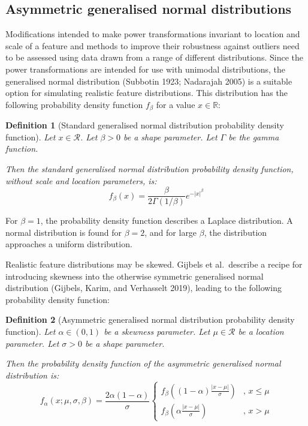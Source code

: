 \documentclass[
  a4paper,
]{article}
\newtheorem*{definition}{Definition}
\begin{document}
\subsection{Asymmetric generalised normal
distributions}\label{asymmetric-generalised-normal-distributions}

Modifications intended to make power transformations invariant to
location and scale of a feature and methods to improve their robustness
against outliers need to be assessed using data drawn from a range of
different distributions. Since the power transformations are intended
for use with unimodal distributions, the generalised normal distribution
(Subbotin 1923; Nadarajah 2005) is a suitable option for simulating
realistic feature distributions. This distribution has the following
probability density function \(f_{\beta}\) for a value
\(x \in \mathbb{R}\):

\begin{definition}[Standard generalised normal distribution probability density function]
Let $x \in \mathcal{R}$.
Let $\beta > 0$ be a shape parameter.
Let $\Gamma$ be the gamma function.

Then the standard generalised normal distribution probability density function, without scale and location parameters, is:
\begin{equation}
f_{\beta}(x) = \frac{\beta}{2\Gamma\left(1 / \beta \right)} e^{-\left| x \right|^\beta}
\end{equation}
\end{definition}

For \(\beta = 1\), the probability density function describes a Laplace
distribution. A normal distribution is found for \(\beta=2\), and for
large \(\beta\), the distribution approaches a uniform distribution.

Realistic feature distributions may be skewed. Gijbels et al.~describe a
recipe for introducing skewness into the otherwise symmetric generalised
normal distribution (Gijbels, Karim, and Verhasselt 2019), leading to
the following probability density function:

\begin{definition}[Asymmetric generalised normal distribution probability density function]
Let $\alpha \in (0,1)$ be a skewness parameter.
Let $\mu \in \mathcal{R}$ be a location parameter.
Let $\sigma > 0$ be a shape parameter.

Then the probability density function of the asymmetric generalised normal distribution is:
\begin{equation}
f_{\alpha}(x; \mu, \sigma, \beta) = \frac{2 \alpha \left(1 - \alpha\right)}{\sigma}
\begin{cases}
f_{\beta}\left( \left(1 - \alpha \right) \frac{\left| x - \mu \right|}{\sigma} \right) & \text{, } x \leq \mu \\
f_{\beta}\left( \alpha \frac{\left| x - \mu \right|}{\sigma} \right) & \text{, } x > \mu
\end{cases}
\end{equation}
\end{definition}
\end{document}
